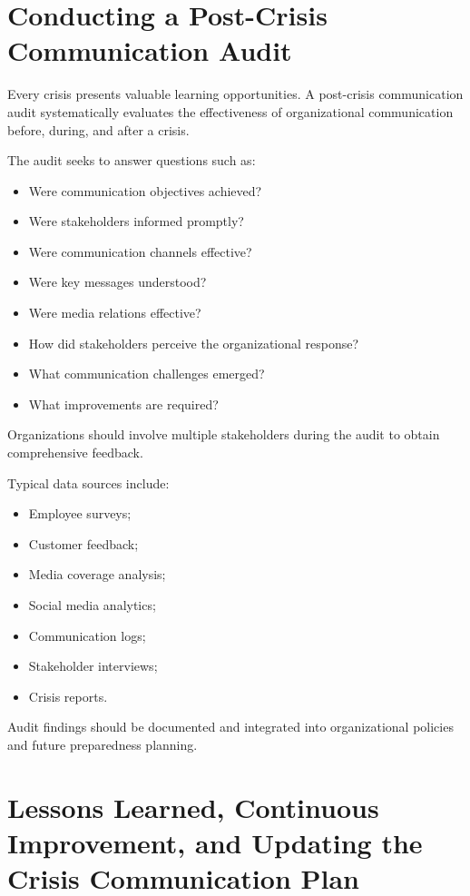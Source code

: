 \documentclass[10pt]{article}
\begin{document}
\section*{Conducting a Post-Crisis Communication Audit}

Every crisis presents valuable learning opportunities. A post-crisis communication audit systematically evaluates the effectiveness of organizational communication before, during, and after a crisis.

The audit seeks to answer questions such as:
\begin{itemize}
    \item Were communication objectives achieved?
    \item Were stakeholders informed promptly?
    \item Were communication channels effective?
    \item Were key messages understood?
    \item Were media relations effective?
    \item How did stakeholders perceive the organizational response?
    \item What communication challenges emerged?
    \item What improvements are required?
\end{itemize}

Organizations should involve multiple stakeholders during the audit to obtain comprehensive feedback.

Typical data sources include:
\begin{itemize}
    \item Employee surveys;
    \item Customer feedback;
    \item Media coverage analysis;
    \item Social media analytics;
    \item Communication logs;
    \item Stakeholder interviews;
    \item Crisis reports.
\end{itemize}

Audit findings should be documented and integrated into organizational policies and future preparedness planning.

\section*{Lessons Learned, Continuous Improvement, and Updating the Crisis Communication Plan}
\end{document}
